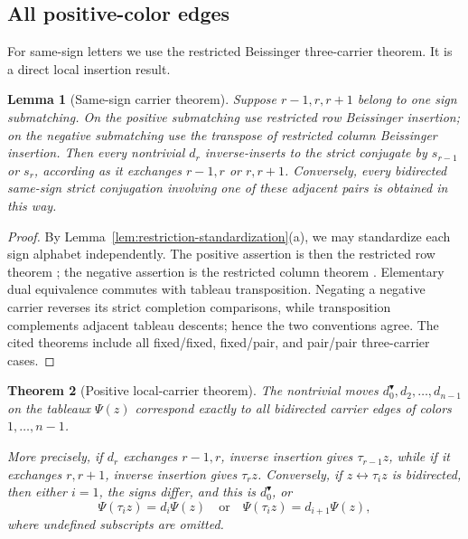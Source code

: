 \documentclass[11pt]{article}
\newtheorem{theorem}{Theorem}[section]
\newtheorem{lemma}[theorem]{Lemma}
\theoremstyle{definition}
\theoremstyle{remark}
\begin{document}
\subsection{All positive-color edges}

For same-sign letters we use the restricted Beissinger three-carrier
theorem.  It is a direct local insertion result.

\begin{lemma}[Same-sign carrier theorem]
\label{lem:same-sign}
Suppose $r-1,r,r+1$ belong to one sign submatching.  On the positive
submatching use restricted row Beissinger insertion; on the negative
submatching use the transpose of restricted column Beissinger insertion.
Then every nontrivial $d_r$ inverse-inserts to the strict conjugate by
$s_{r-1}$ or $s_r$, according as it exchanges $r-1,r$ or $r,r+1$.
Conversely, every bidirected same-sign strict conjugation involving one of
these adjacent pairs is obtained in this way.
\end{lemma}

\begin{proof}
By Lemma~\ref{lem:restriction-standardization}(a), we may standardize each
sign alphabet independently.  The positive assertion is then the
restricted row theorem \cite[Theorem~3.15]{MZInsertion}; the negative
assertion is the restricted column theorem
\cite[Theorem~3.18]{MZInsertion}.  Elementary dual equivalence commutes
with tableau transposition.  Negating a negative carrier reverses its
strict completion comparisons, while transposition complements adjacent
tableau descents; hence the two conventions agree.  The cited theorems
include all fixed/fixed, fixed/pair, and pair/pair three-carrier cases.
\end{proof}

\begin{theorem}[Positive local-carrier theorem]
\label{thm:positive-local}
The nontrivial moves $d_0^{\blacktriangledown},d_2,\ldots,d_{n-1}$ on the
tableaux $\Psi(z)$ correspond exactly to all bidirected carrier edges of
colors $1,\ldots,n-1$.

More precisely, if $d_r$ exchanges $r-1,r$, inverse insertion gives
$\tau_{r-1}z$, while if it exchanges $r,r+1$, inverse insertion gives
$\tau_rz$.  Conversely, if $z\leftrightarrow\tau_i z$ is bidirected,
then either $i=1$, the signs differ, and this is $d_0^{\blacktriangledown}$, or
\[
 \Psi(\tau_i z)=d_i\Psi(z)
 \quad\text{or}\quad
 \Psi(\tau_i z)=d_{i+1}\Psi(z),
\]
where undefined subscripts are omitted.
\end{theorem}
\end{document}
